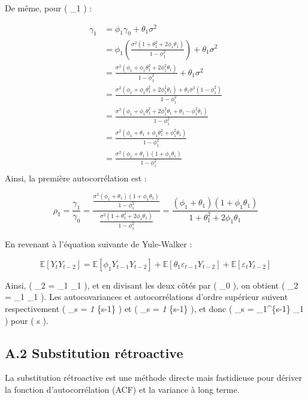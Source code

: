\documentclass[
  letterpaper,
  DIV=11,
  numbers=noendperiod]{scrartcl}
\begin{document}
De même, pour ( \gamma\_1 ) :

\[
\begin{aligned}
\gamma_1 &= \phi_1 \gamma_0 + \theta_1 \sigma^2 \\
&= \phi_1 \left( \frac{\sigma^2 (1 + \theta_1^2 + 2 \phi_1 \theta_1)}{1 - \phi_1^2} \right) + \theta_1 \sigma^2 \\
&= \frac{\sigma^2 (\phi_1 + \phi_1 \theta_1^2 + 2 \phi_1^2 \theta_1)}{1 - \phi_1^2} + \theta_1 \sigma^2 \\
&= \frac{\sigma^2 (\phi_1 + \phi_1 \theta_1^2 + 2 \phi_1^2 \theta_1) + \theta_1 \sigma^2 (1 - \phi_1^2)}{1 - \phi_1^2} \\
&= \frac{\sigma^2 (\phi_1 + \phi_1 \theta_1^2 + 2 \phi_1^2 \theta_1 + \theta_1 - \phi_1^2 \theta_1)}{1 - \phi_1^2} \\
&= \frac{\sigma^2 (\phi_1 + \theta_1 + \phi_1 \theta_1^2 + \phi_1^2 \theta_1)}{1 - \phi_1^2} \\
&= \frac{\sigma^2 (\phi_1 + \theta_1)(1 + \phi_1 \theta_1)}{1 - \phi_1^2} \\
\end{aligned}
\] Ainsi, la première autocorrélation est :

\[
\rho_1 = \frac{\gamma_1}{\gamma_0} = \frac{\frac{\sigma^2 (\phi_1 + \theta_1)(1 + \phi_1 \theta_1)}{1 - \phi_1^2}}{\frac{\sigma^2 (1 + \theta_1^2 + 2 \phi_1 \theta_1)}{1 - \phi_1^2}} = \frac{(\phi_1 + \theta_1)(1 + \phi_1 \theta_1)}{1 + \theta_1^2 + 2 \phi_1 \theta_1}
\]

En revenant à l'équation suivante de Yule-Walker :

\[
\mathbb{E}[Y_t Y_{t-2}] = \mathbb{E}[\phi_1 Y_{t-1} Y_{t-2}] + \mathbb{E}[\theta_1 \varepsilon_{t-1} Y_{t-2}] + \mathbb{E}[\varepsilon_t Y_{t-2}]
\]

Ainsi, ( \gamma\_2 = \phi\_1 \gamma\_1 ), et en divisant les deux côtés
par ( \gamma\_0 ), on obtient ( \rho\_2 = \phi\_1 \rho\_1 ). Les
autocovariances et autocorrélations d'ordre supérieur suivent
respectivement ( \gamma\_s = \phi\emph{1 \gamma}\{s-1\} ) et ( \rho\_s =
\phi\emph{1 \rho}\{s-1\} ), et donc ( \rho\_s = \phi\_1\^{}\{s-1\}
\rho\_1 ) pour ( s  ).

\subsection{A.2 Substitution
rétroactive}\label{a.2-substitution-ruxe9troactive}

La substitution rétroactive est une méthode directe mais fastidieuse
pour dériver la fonction d'autocorrélation (ACF) et la variance à long
terme.
\end{document}

